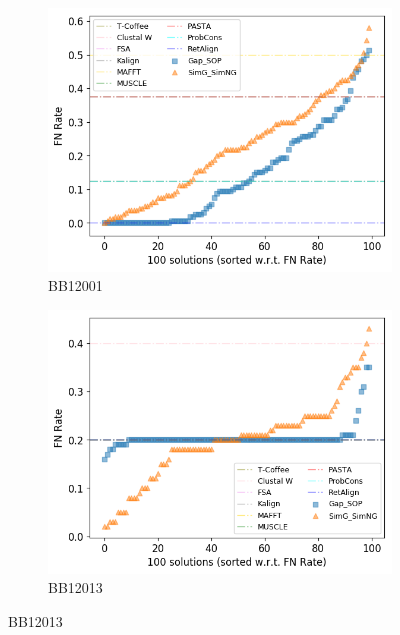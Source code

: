 \begin{figure}[!htbp]
	\centering
	\begin{adjustwidth}{-1cm}{-1cm}
		\begin{subfigure}{0.22\textwidth}
			\includegraphics[width=\columnwidth]{Figure/summary/precomputedInit/Balibase/BB12001_fnrate_density_single_run}
			\caption{BB12001}
		\end{subfigure}	
		\begin{subfigure}{0.22\textwidth}
			\includegraphics[width=\columnwidth]{Figure/summary/precomputedInit/Balibase/BB12013_fnrate_density_single_run}
			\caption{BB12013}

\end{subfigure}
\end{adjustwidth}
\end{figure}
